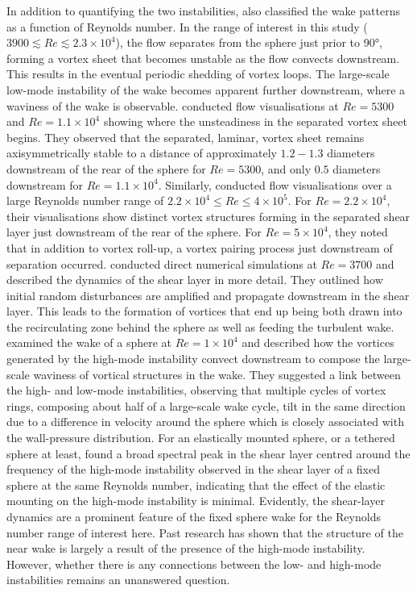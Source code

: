 \documentclass[3p]{elsarticle}
\begin{document}
In addition to quantifying the two instabilities, \citet{Sakamoto1990}
also classified the wake patterns as a function of Reynolds number. In the range of interest in this study ($3900 \lesssim Re \lesssim 2.3\times10^4$), the flow separates from the sphere just prior to \ang{90}, forming a vortex sheet that becomes unstable as the flow convects downstream. 
This results in the
eventual periodic shedding of vortex loops. The large-scale low-mode
instability of the wake becomes apparent further downstream, where a
waviness of the wake is observable. \citet{Jang2007} conducted flow
visualisations at $Re = 5300$ and $Re = 1.1\times10^4$ showing where
the unsteadiness in the separated vortex sheet begins. They
observed that the separated, laminar, vortex sheet remains
axisymmetrically stable to a distance of approximately $1.2-1.3$
diameters downstream of the rear of the sphere for $Re = 5300$, and
only $0.5$ diameters downstream for $Re = 1.1\times10^4$. Similarly, \citet{Bakic2006} conducted flow visualisations over a large
Reynolds number range of
$2.2\times10^4 \leqslant Re \leqslant 4\times10^5$. For
$Re = 2.2\times10^4$, their visualisations show distinct vortex
structures forming in the separated shear layer just downstream of the
rear of the sphere. For $Re = 5\times10^4$, they noted that in
addition to vortex roll-up, a vortex pairing process just downstream
of separation occurred. \citet{Rodriguez2011} conducted direct
numerical simulations at $Re = 3700$ and described the dynamics of the
shear layer in more detail. They outlined how initial random
disturbances are amplified and propagate downstream in the shear
layer. This leads to the formation of vortices that end up being both
drawn into the recirculating zone behind the sphere as well as feeding
the turbulent wake. \citet{Yun2006} examined the wake of a sphere at
$Re = 1 \times10^4$ and described how the vortices generated by the
high-mode instability convect downstream to compose the large-scale
waviness of vortical structures in the wake. They suggested a link
between the high- and low-mode instabilities, observing that multiple
cycles of vortex rings, composing about half of a large-scale wake
cycle, tilt in the same direction due to a difference in velocity
around the sphere which is closely associated with the wall-pressure
distribution. For an elastically mounted sphere,
or a tethered sphere at least, \citet{vanHout2013} found a broad
spectral peak in the shear layer centred around the frequency of the high-mode instability observed
in the shear layer of a fixed sphere at the same Reynolds number,
indicating that the effect of the elastic mounting on the high-mode
instability is minimal. 
Evidently, the shear-layer dynamics are a prominent
feature of the fixed sphere wake for the Reynolds number range of
interest here. Past research has shown that the structure of the near
wake is largely a result of the presence of the high-mode instability.
However, whether there is any connections between the low-
and high-mode instabilities remains an unanswered question.
\end{document}
